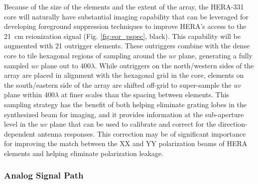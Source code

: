 \documentclass[preprint]{aastex}
\newcommand{\compress}{\vspace{-0.3in}}
\begin{document}
Because of the size of the elements and the extent of the array, the HERA-331 core will naturally have substantial
imaging capability that can be leveraged for developing foreground suppression techniques
to improve HERA's access to the 21~cm reionization signal 
(Fig. \ref{fig:eor_pspec}, black).
This capability will be augmented with 21 outrigger elements.  These outriggers
combine with the dense core to tile hexagonal regions of sampling around the $uv$ plane, generating a fully
sampled $uv$ plane out to 400$\lambda$.  While outriggers on the north/western sides of the array are
placed in alignment with the hexagonal grid in the core, elements on the south/eastern side of the array are
shifted off-grid to super-sample the $uv$ plane within 400$\lambda$ at finer scales than the spacing
between elements.  This sampling strategy has the benefit of both helping eliminate grating lobes in the
synthesized beam for imaging, and it provides information at the sub-aperture level in the $uv$ plane that
can be used to calibrate and correct for the direction-dependent antenna responses.  This correction may
be of significant importance for improving the match between the XX and YY polarization beams of HERA elements
and helping eliminate polarization leakage.


\compress
\subsubsection{Analog Signal Path}
\vspace{-6pt}
\end{document}
